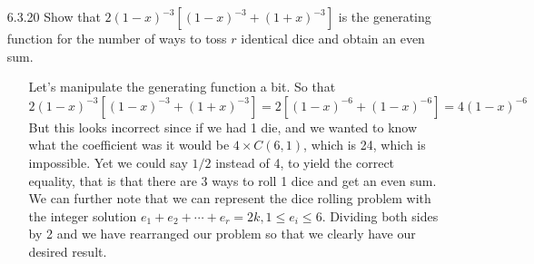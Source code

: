 \documentclass[12pt]{article}
\begin{document}
\begin{enumerate}
\item[6.3.20] Show that $2(1 - x)^{-3}[(1 - x)^{-3} + (1 + x)^{-3}]$ is the generating function for the number of ways to toss $r$ identical dice and obtain an even sum.
\begin{enumerate}
\item[] Let's manipulate the generating function a bit. So that
\[
2(1 - x)^{-3}[(1 - x)^{-3} + (1 + x)^{-3}] = 2[(1 - x)^{-6} + (1 - x)^{-6}] = 4(1 - x)^{-6}
\]
But this looks incorrect since if we had 1 die, and we wanted to know what the coefficient was it would
be $4 \times C(6, 1)$, which is 24, which is impossible. Yet we could say $1/2$ instead of 4, to 
yield the correct equality, that is that there are 3 ways to roll 1 dice and get an even sum. We can further note
that we can represent the dice rolling problem with the integer solution $e_1 + e_2 + \cdots + e_r = 2k, 1 \leq 
e_i \leq 6$. Dividing both sides by 2 and we have rearranged our problem so that we clearly have
our desired result.
\end{enumerate}


\end{enumerate}
\end{document}
